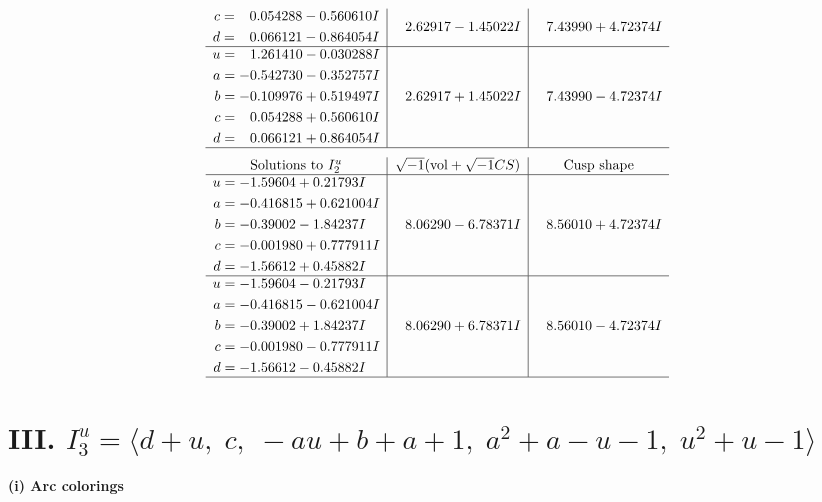 \documentclass[1p]{elsarticle_modified}
\theoremstyle{definition}
\newcommand{\I}{\sqrt{-1}}
\begin{document}
$$\begin{array}{c|c|c}
\begin{aligned}
c &= \phantom{-}0.054288 - 0.560610 I \\
d &= \phantom{-}0.066121 - 0.864054 I\end{aligned}
 & \phantom{-}2.62917 - 1.45022 I & \phantom{-}7.43990 + 4.72374 I \\ \hline\begin{aligned}
u &= \phantom{-}1.261410 - 0.030288 I \\
a &= -0.542730 - 0.352757 I \\
b &= -0.109976 + 0.519497 I \\
c &= \phantom{-}0.054288 + 0.560610 I \\
d &= \phantom{-}0.066121 + 0.864054 I\end{aligned}
 & \phantom{-}2.62917 + 1.45022 I & \phantom{-}7.43990 - 4.72374 I\\
 \hline 
 \end{array}$$\newpage$$\begin{array}{c|c|c}  
\text{Solutions to }I^u_{2}& \I (\text{vol} + \sqrt{-1}CS) & \text{Cusp shape}\\
 \hline 
\begin{aligned}
u &= -1.59604 + 0.21793 I \\
a &= -0.416815 + 0.621004 I \\
b &= -0.39002 - 1.84237 I \\
c &= -0.001980 + 0.777911 I \\
d &= -1.56612 + 0.45882 I\end{aligned}
 & \phantom{-}8.06290 - 6.78371 I & \phantom{-}8.56010 + 4.72374 I \\ \hline\begin{aligned}
u &= -1.59604 - 0.21793 I \\
a &= -0.416815 - 0.621004 I \\
b &= -0.39002 + 1.84237 I \\
c &= -0.001980 - 0.777911 I \\
d &= -1.56612 - 0.45882 I\end{aligned}
 & \phantom{-}8.06290 + 6.78371 I & \phantom{-}8.56010 - 4.72374 I\\
 \hline 
 \end{array}$$\newpage\newpage\renewcommand{\arraystretch}{1}
\centering \section*{III. $I^u_{3}= \langle d+u,\;c,\;- a u+b+a+1,\;a^2+a- u-1,\;u^2+u-1 \rangle$}
\flushleft \textbf{(i) Arc colorings}\\
\end{document}

